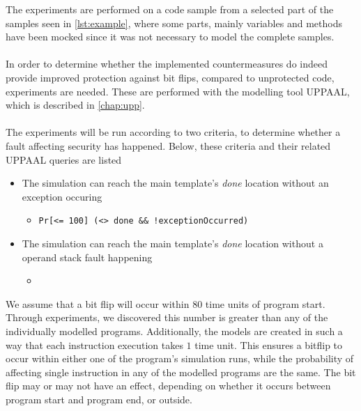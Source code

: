 The experiments are performed on a code sample from a selected part of the \jc samples seen in \cref{lst:example}, where some parts, mainly variables and methods have been mocked since it was not necessary to model the complete samples.\\\\
In order to determine whether the implemented countermeasures do indeed provide improved protection against bit flips, compared to unprotected code, experiments are needed. These are performed with the modelling tool UPPAAL, which is described in \cref{chap:upp}.\\\\
The experiments will be run according to two criteria, to determine whether a fault affecting security has happened. Below, these criteria and their related UPPAAL queries are listed

\begin{itemize}
\item The simulation can reach the main template's \textit{done} location without an exception occuring
	\begin{itemize}
	\item \texttt{Pr[<= 100] (<> done \&\& !exceptionOccurred)}
	\end{itemize}
\item The simulation can reach the main template's \textit{done} location without a operand stack fault happening
	\begin{itemize}
	\item
	\end{itemize}
\end{itemize}

We assume that a bit flip will occur within $80$ time units of program start. Through experiments, we discovered this number is greater than any of the individually modelled programs. Additionally, the models are created in such a way that each instruction execution takes $1$ time unit. This ensures a bitflip to occur within either one of the program's simulation runs, while the probability of affecting single instruction in any of the modelled programs are the same. The bit flip may or may not have an effect, depending on whether it occurs between program start and program end, or outside.